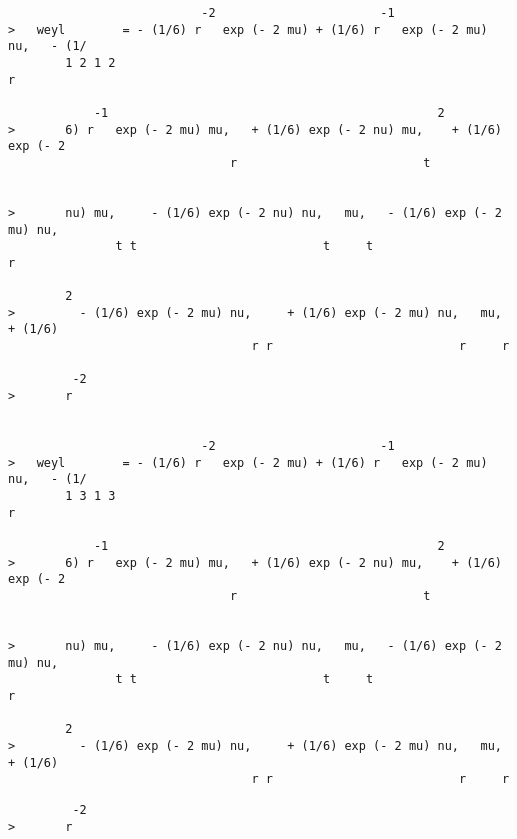 \begin{verbatim}
                           -2                       -1
>   weyl        = - (1/6) r   exp (- 2 mu) + (1/6) r   exp (- 2 mu) nu,   - (1/
        1 2 1 2                                                        r

            -1                                              2
>       6) r   exp (- 2 mu) mu,   + (1/6) exp (- 2 nu) mu,    + (1/6) exp (- 2
                               r                          t


>       nu) mu,     - (1/6) exp (- 2 nu) nu,   mu,   - (1/6) exp (- 2 mu) nu,
               t t                          t     t                          r

        2
>         - (1/6) exp (- 2 mu) nu,     + (1/6) exp (- 2 mu) nu,   mu,   + (1/6)
                                  r r                          r     r

         -2
>       r


                           -2                       -1
>   weyl        = - (1/6) r   exp (- 2 mu) + (1/6) r   exp (- 2 mu) nu,   - (1/
        1 3 1 3                                                        r

            -1                                              2
>       6) r   exp (- 2 mu) mu,   + (1/6) exp (- 2 nu) mu,    + (1/6) exp (- 2
                               r                          t


>       nu) mu,     - (1/6) exp (- 2 nu) nu,   mu,   - (1/6) exp (- 2 mu) nu,
               t t                          t     t                          r

        2
>         - (1/6) exp (- 2 mu) nu,     + (1/6) exp (- 2 mu) nu,   mu,   + (1/6)
                                  r r                          r     r

\end{verbatim}
{\samepage
\begin{verbatim}
         -2
>       r
\end{verbatim}
          }
